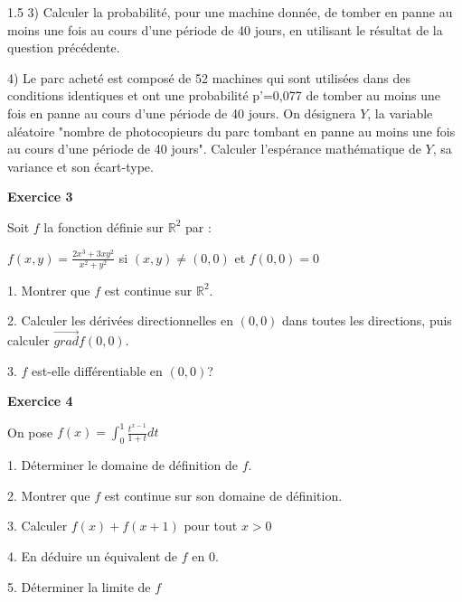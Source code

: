 \documentclass[12pt]{article}
\begin{document}
\begin{spacing}{1.5}
 3) Calculer la probabilité, pour une machine donnée, de tomber en panne au moins une fois au cours d'une période de 40 jours, en utilisant le résultat de la question précédente.
 
 4) Le parc acheté est composé de 52 machines qui sont utilisées dans des conditions identiques et ont une probabilité p'=0,077 de tomber au moins une
 fois en panne au cours d'une période de 40 jours. On désignera $Y$, la variable aléatoire "nombre de photocopieurs du parc tombant en panne au moins une
 fois au cours d'une période de 40 jours". Calculer l'espérance mathématique de $Y$, sa variance et son écart-type.

\medskip \textbf{Exercice 3 }

 Soit $f$ la fonction  définie sur $\mathbb{R}^2$ par :
 
 $
 f(x,y) = \frac{2x^3+3xy^2}{x^2+y^2}$ si $(x,y)\neq (0,0)$ et $f(0,0) = 0$
 
 1. Montrer que $f$ est continue sur $\mathbb{R}^2$.

 2. Calculer les dérivées directionnelles en $(0,0)$ dans toutes les directions, puis calculer $\overrightarrow{grad}f(0,0)$.
 
 3. $f$ est-elle différentiable en $(0,0)$?
 
 \medskip\textbf{Exercice 4}

On pose $f(x)=\int_{0}^{1}\frac{t^{x-1}}{1+t}dt$

1. Déterminer le domaine de définition de $f$.

2. Montrer que $f$ est continue sur son domaine de définition.

3. Calculer $f(x)+f(x+1)$ pour tout $x>0$

4. En déduire un équivalent de $f$ en 0.

5. Déterminer la limite de $f$ 

\quad

\quad

\end{spacing}
\end{document}
